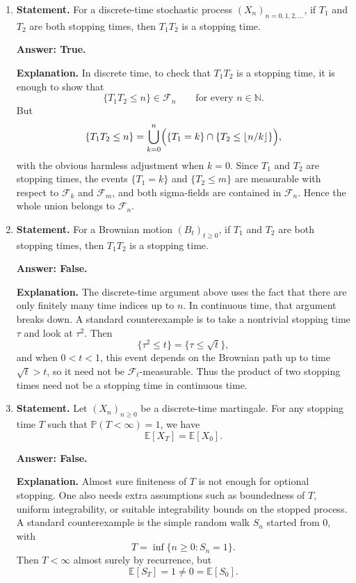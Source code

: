 \documentclass[11pt]{article}
\theoremstyle{definition}
\begin{document}
\begin{enumerate}[label=(\arabic*)]

\item \textbf{Statement.} For a discrete-time stochastic process \((X_n)_{n=0,1,2,\dots}\), if \(T_1\) and \(T_2\) are both stopping times, then \(T_1T_2\) is a stopping time.

\textbf{Answer: True.}

\textbf{Explanation.}
In discrete time, to check that \(T_1T_2\) is a stopping time, it is enough to show that
\[
\{T_1T_2\le n\}\in \mathcal F_n
\qquad \text{for every } n\in \mathbb N.
\]
But
\[
\{T_1T_2\le n\}
=
\bigcup_{k=0}^n \Bigl(\{T_1=k\}\cap \{T_2\le \lfloor n/k\rfloor\}\Bigr),
\]
with the obvious harmless adjustment when \(k=0\).
Since \(T_1\) and \(T_2\) are stopping times, the events \(\{T_1=k\}\) and \(\{T_2\le m\}\) are measurable with respect to \(\mathcal F_k\) and \(\mathcal F_m\), and both sigma-fields are contained in \(\mathcal F_n\). Hence the whole union belongs to \(\mathcal F_n\).

\item \textbf{Statement.} For a Brownian motion \((B_t)_{t\ge 0}\), if \(T_1\) and \(T_2\) are both stopping times, then \(T_1T_2\) is a stopping time.

\textbf{Answer: False.}

\textbf{Explanation.}
The discrete-time argument above uses the fact that there are only finitely many time indices up to \(n\). In continuous time, that argument breaks down. A standard counterexample is to take a nontrivial stopping time \(\tau\) and look at \(\tau^2\). Then
\[
\{\tau^2\le t\}=\{\tau\le \sqrt t\},
\]
and when \(0<t<1\), this event depends on the Brownian path up to time \(\sqrt t>t\), so it need not be \(\mathcal F_t\)-measurable. Thus the product of two stopping times need not be a stopping time in continuous time.

\item \textbf{Statement.} Let \((X_n)_{n\ge 0}\) be a discrete-time martingale. For any stopping time \(T\) such that \(\mathbb P(T<\infty)=1\), we have
\[
\mathbb E[X_T]=\mathbb E[X_0].
\]

\textbf{Answer: False.}

\textbf{Explanation.}
Almost sure finiteness of \(T\) is not enough for optional stopping. One also needs extra assumptions such as boundedness of \(T\), uniform integrability, or suitable integrability bounds on the stopped process.
A standard counterexample is the simple random walk \(S_n\) started from \(0\), with
\[
T=\inf\{n\ge 0:S_n=1\}.
\]
Then \(T<\infty\) almost surely by recurrence, but
\[
\mathbb E[S_T]=1\neq 0=\mathbb E[S_0].
\]


\end{enumerate}
\end{document}
